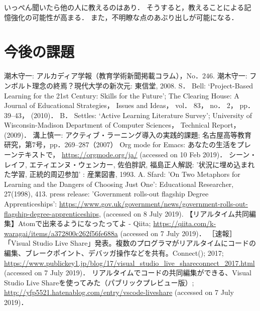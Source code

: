 \documentclass[a4,p11]{article}
\begin{document}
いっぺん聞いたら他の人に教えるのはあり．
そうすると，教えることによる記憶強化の可能性が高まる．
また，不明瞭な点のあぶり出しが可能になる．

\section{今後の課題}
\label{sec:orgfcffc49}

\begin{thebibliography}{7}
 潮木守一: アルカディア学報（教育学術新聞掲載コラム），No．246.
 潮木守一: フンボルト理念の終焉？現代大学の新次元: 東信堂, 2008.
 S． Bell: ‘Project-Based Learning for the 21st Century: Skills for the Future’; The Clearing House: A Journal of Educational Strategies， Issues and Ideas， vol． 83， no． 2， pp． 39–43， (2010)．
 B． Settles: ‘Active Learning Literature Survey’; University of Wisconsin-Madison Department of Computer Sciences， Technical Report， (2009)．
 溝上慎一: アクティブ・ラーニング導入の実践的課題; 名古屋高等教育研究，第7号，pp．269--287（2007）
 Org mode for Emacs: あなたの生活をプレーンテキストで， \url{https://orgmode.org/ja/} (accessed on 10 Feb 2019)．
 シーン・レイフ, エティエンヌ・ウェンカー, 佐伯胖訳, 福島正人解説: '状況に埋め込まれた学習, 正統的周辺参加' : 産業図書, 1993.
 A. Sfard: 'On Two Metaphors for Learning and the Dangers of Choosing Just One': Educational Researcher, 27(1998), 413.
 press release: 'Government rolls-out flagship Degree Apprenticeships': \url{https://www.gov.uk/government/news/government-rolls-out-flagship-degree-apprenticeships}, (accessed on 8 July 2019).
 【リアルタイム共同編集】Atomで出来るようになったってよ - Qiita; \url{https://qiita.com/k-waragai/items/a372800c262f56fe688a} (accessed on 7 July 2019)．
  ［速報］「Visual Studio Live Share」発表。複数のプログラマがリアルタイムにコードの編集、ブレークポイント、デバッガ操作などを共有。Connect(); 2017; \url{https://www.publickey1.jp/blog/17/visual_studio_live_shareconnect_2017.html} (accessed on 7 July 2019)．
 リアルタイムでコードの共同編集ができる、Visual Studio Live Shareを使ってみた（パブリックプレビュー版）; \url{http://yfp5521.hatenablog.com/entry/vscode-liveshare} (accessed on 7 July 2019)．
\end{thebibliography}
\end{document}
